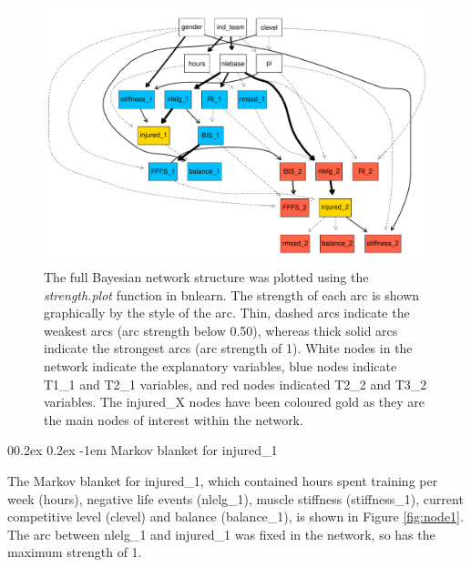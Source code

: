 \documentclass[
  english,
  man,floatsintext]{apa6}
\makeatletter
\renewcommand{\paragraph}{\@startsection{paragraph}{4}{\parindent}%
  {0\baselineskip \@plus 0.2ex \@minus 0.2ex}%
  {-1em}%
  {\normalfont\normalsize\bfseries\itshape\typesectitle}}
\makeatother
\begin{document}
\newpage
\begin{landscape}

\begin{figure}
\centering
\includegraphics{full_phd_files/figure-latex/networkstructure-1.pdf}
\caption{\label{fig:networkstructure}The full Bayesian network structure was plotted using the \emph{strength.plot} function in bnlearn. The strength of each arc is shown graphically by the style of the arc. Thin, dashed arcs indicate the weakest arcs (arc strength below 0.50), whereas thick solid arcs indicate the strongest arcs (arc strength of 1). White nodes in the network indicate the explanatory variables, blue nodes indicate T1\_1 and T2\_1 variables, and red nodes indicated T2\_2 and T3\_2 variables. The injured\_X nodes have been coloured gold as they are the main nodes of interest within the network.}
\end{figure}

\end{landscape}

\hypertarget{markov-blanket-for-injured_1}{%
\paragraph{Markov blanket for injured\_1}\label{markov-blanket-for-injured_1}}

The Markov blanket for injured\_1, which contained hours spent training per week (hours), negative life events (nlelg\_1), muscle stiffness (stiffness\_1), current competitive level (clevel) and balance (balance\_1), is shown in Figure \ref{fig:node1}.
The arc between nlelg\_1 and injured\_1 was fixed in the network, so has the maximum strength of 1.
\end{document}
